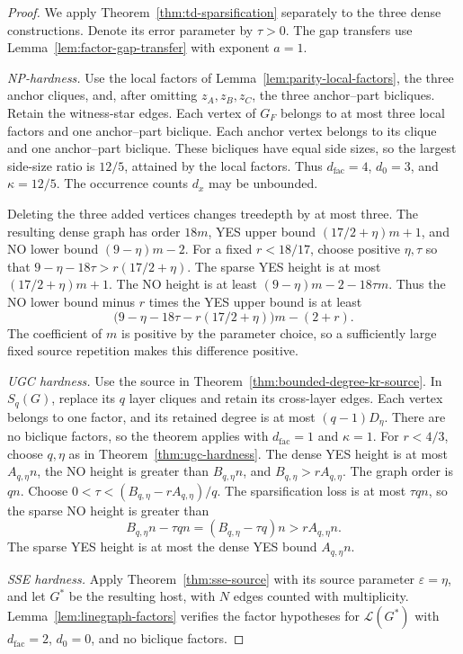\begin{proof}
We apply Theorem~\ref{thm:td-sparsification} separately to the three
dense constructions. Denote its error parameter by $\tau>0$.
The gap transfers use Lemma~\ref{lem:factor-gap-transfer} with
exponent $a=1$.

\emph{\textup{NP}-hardness.}
Use the local factors of Lemma~\ref{lem:parity-local-factors},
the three anchor cliques, and, after omitting $z_A,z_B,z_C$, the
three anchor--part bicliques. Retain the witness-star edges.
Each vertex of $G_F$ belongs to at most three local factors and one
anchor--part biclique. Each anchor vertex belongs to its clique and
one anchor--part biclique. These bicliques have equal side sizes, so
the largest side-size ratio is $12/5$, attained by the local factors.
Thus $d_{\mathrm{fac}}=4$, $d_0=3$, and $\kappa=12/5$. The occurrence
counts $d_x$ may be unbounded.

Deleting the three added vertices
changes treedepth by at most three. The resulting dense graph has
order $18m$, YES upper bound $(17/2+\eta)m+1$, and NO lower bound
$(9-\eta)m-2$. For a fixed $r<18/17$, choose positive $\eta,\tau$
so that $9-\eta-18\tau>r(17/2+\eta)$.
The sparse YES height is at most $(17/2+\eta)m+1$. The NO height is
at least $(9-\eta)m-2-18\tau m$. Thus the NO lower bound minus
$r$ times the YES upper bound is at least
\[
 \bigl(9-\eta-18\tau-r(17/2+\eta)\bigr)m-(2+r).
\]
The coefficient of $m$ is positive by the parameter choice, so a
sufficiently large fixed source repetition makes this difference
positive.

\emph{\textup{UGC} hardness.}
Use the source in Theorem~\ref{thm:bounded-degree-kr-source}. In
$S_q(G)$, replace its $q$ layer cliques and retain its cross-layer
edges. Each vertex belongs to one factor, and its retained degree
is at most $(q-1)D_\eta$. There are no biclique factors, so the
theorem applies with $d_{\mathrm{fac}}=1$ and $\kappa=1$. For $r<4/3$, choose
$q,\eta$ as in Theorem~\ref{thm:ugc-hardness}. The dense YES
height is at most $A_{q,\eta}n$, the NO height is greater than
$B_{q,\eta}n$, and $B_{q,\eta}>rA_{q,\eta}$. The graph order is
$qn$. Choose $0<\tau<(B_{q,\eta}-rA_{q,\eta})/q$. The sparsification
loss is at most $\tau qn$, so the sparse NO height is greater than
\[
 B_{q,\eta}n-\tau qn
       =(B_{q,\eta}-\tau q)n>rA_{q,\eta}n.
\]
The sparse YES height is at most the dense YES bound $A_{q,\eta}n$.

\emph{\textup{SSE} hardness.}
Apply Theorem~\ref{thm:sse-source} with its source parameter
$\varepsilon=\eta$, and let $G^*$ be the resulting host, with $N$
edges counted with multiplicity. Lemma~\ref{lem:linegraph-factors}
verifies the factor hypotheses for $\mathcal L(G^*)$ with $d_{\mathrm{fac}}=2$,
$d_0=0$, and no biclique factors.


\end{proof}
